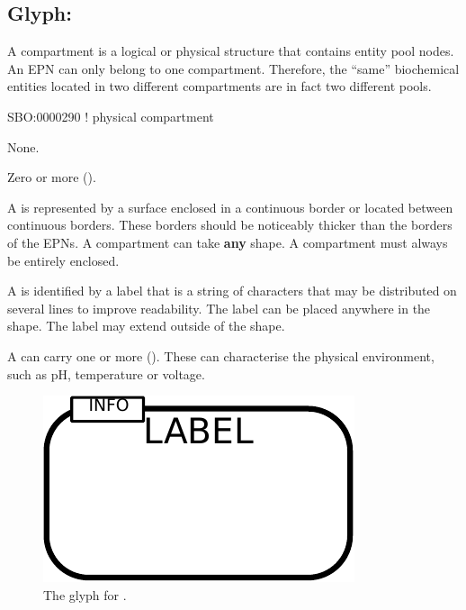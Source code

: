 \subsection{Glyph: }
\label{sec:compartment}

A compartment is a logical or physical structure that contains entity pool nodes. An EPN can only belong to one compartment. Therefore, the ``same'' biochemical entities located in two different compartments are in fact two different pools.

\begin{glyphDescription}

\glyphSboTerm  SBO:0000290 ! physical compartment

\glyphIncoming
None.

\glyphOutgoing
Zero or more  ().

\glyphContainer
A  is represented by a surface enclosed in a continuous border or located between continuous borders.
These borders should be noticeably thicker than the borders of the EPNs.
A compartment can take \textbf{any} shape.
A compartment must always be entirely enclosed.

\glyphLabel
A  is identified by a label that is  a string of characters that may be distributed on several lines to improve readability.
The label can be placed anywhere in the shape.
The label may extend outside of the shape.

\glyphAux
A  can carry one or more  ().
These can characterise the physical environment, such as pH, temperature or voltage.

\end{glyphDescription}

\begin{figure}[H]
  \centering
  \includegraphics{images/build/compartment.pdf}
  \caption{The \PD glyph for .}
  \label{fig:compartment}
\end{figure}

